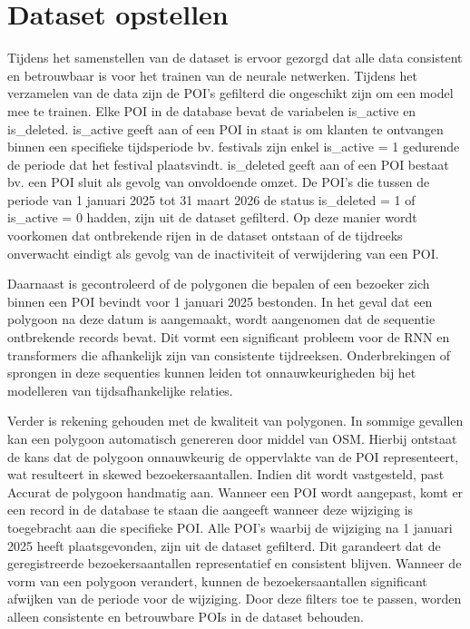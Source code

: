 \section{Dataset opstellen}
Tijdens het samenstellen van de dataset is ervoor gezorgd dat alle data consistent en betrouwbaar is voor het trainen van de neurale netwerken. Tijdens het verzamelen van de data zijn de POI’s gefilterd die ongeschikt zijn om een model mee te trainen. Elke POI in de database bevat de variabelen is\_active en is\_deleted. is\_active geeft aan of een POI in staat is om klanten te ontvangen binnen een specifieke tijdsperiode bv. festivals zijn enkel is\_active = 1 gedurende de periode dat het festival plaatsvindt. is\_deleted geeft aan of een POI bestaat bv. een POI sluit als gevolg van onvoldoende omzet. De POI’s die tussen de periode van 1 januari 2025 tot 31 maart 2026 de status is\_deleted = 1 of is\_active = 0 hadden, zijn uit de dataset gefilterd. Op deze manier wordt voorkomen dat ontbrekende rijen in de dataset ontstaan of de tijdreeks onverwacht eindigt als gevolg van de inactiviteit of verwijdering van een POI.

Daarnaast is gecontroleerd of de polygonen die bepalen of een bezoeker zich binnen een POI bevindt voor 1 januari 2025 bestonden. In het geval dat een polygoon na deze datum is aangemaakt, wordt aangenomen dat de sequentie ontbrekende records bevat. Dit vormt een significant probleem voor de RNN en transformers die afhankelijk zijn van consistente tijdreeksen. Onderbrekingen of sprongen in deze sequenties kunnen leiden tot onnauwkeurigheden bij het modelleren van tijdsafhankelijke relaties.

Verder is rekening gehouden met de kwaliteit van polygonen. In sommige gevallen kan een polygoon automatisch genereren door middel van OSM. Hierbij ontstaat de kans dat de polygoon onnauwkeurig de oppervlakte van de POI representeert, wat resulteert in skewed bezoekersaantallen. Indien dit wordt vastgesteld, past Accurat de polygoon handmatig aan. Wanneer een POI wordt aangepast, komt er een record in de database te staan die aangeeft wanneer deze wijziging is toegebracht aan die specifieke POI. Alle POI’s waarbij de wijziging na 1 januari 2025 heeft plaatsgevonden, zijn uit de dataset gefilterd. Dit garandeert dat de geregistreerde bezoekersaantallen representatief en consistent blijven. Wanneer de vorm van een polygoon verandert, kunnen de bezoekersaantallen significant afwijken van de periode voor de wijziging. Door deze filters toe te passen, worden alleen consistente en betrouwbare POIs in de dataset behouden.

